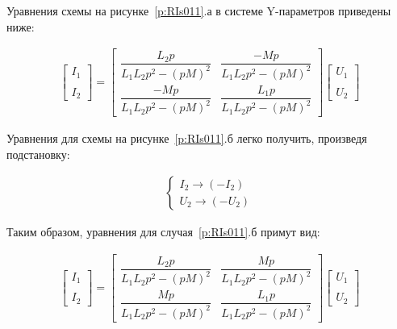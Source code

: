 Уравнения  схемы  на  рисунке~\ref{p:RIs011}.а  в  системе  Y-параметров приведены ниже: 



\begin{equation}
\label{eq:9}
\begin{aligned}
\begin{bmatrix} I_{1}\\ \\ I_{2} \end{bmatrix} = 
\begin{bmatrix} \dfrac{L_{2} p}{L_{1} L_{2} p^{2} - (p M)^{2}} &
                           \dfrac{-M p}{L_{1} L_{2} p^{2} - (p M)^{2}}\\ 
						      \dfrac{-M p}{L_{1} L_{2} p^{2} - (p M)^{2}} &
							  \dfrac{L_{1} p}{L_{1} L_{2} p^{2} - (p M)^{2}}
\end{bmatrix}
\begin{bmatrix} U_{1}\\ \\  U_{2} \end{bmatrix}
\end{aligned}
\end{equation}




Уравнения  для  схемы  на  рисунке~\ref{p:RIs011}.б  легко  получить,  произведя подстановку: 

\begin{equation}
\label{eq:10}
\begin{aligned}
 \begin{cases}
I_{2} \to (- I_{2})\\
U_{2} \to (- U_{2})
 \end{cases}
\end{aligned}
\end{equation}

Таким образом, уравнения для случая~\ref{p:RIs011}.б примут вид: 


\begin{equation}
\label{eq:11}
\begin{aligned}
\begin{bmatrix} I_{1}\\ \\ I_{2} \end{bmatrix} = 
\begin{bmatrix} \dfrac{L_{2} p}{L_{1} L_{2} p^{2} - (p M)^{2}} &
                           \dfrac{M p}{L_{1} L_{2} p^{2} - (p M)^{2}}\\ 
						      \dfrac{M p}{L_{1} L_{2} p^{2} - (p M)^{2}} &
							  \dfrac{L_{1} p}{L_{1} L_{2} p^{2} - (p M)^{2}}
\end{bmatrix}
 \begin{bmatrix} U_{1}\\ \\  U_{2} \end{bmatrix}
\end{aligned}
\end{equation}


